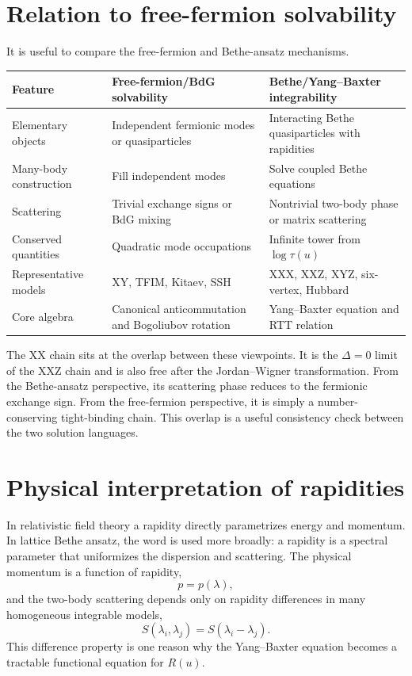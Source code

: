 \section{Relation to free-fermion solvability}
\label{sec:bethe-vs-free-fermion-preview}

It is useful to compare the free-fermion and Bethe-ansatz mechanisms.

\begin{center}
\begin{tabularx}{\textwidth}{L{0.26\textwidth}Y Y}
\toprule
Feature & Free-fermion/BdG solvability & Bethe/Yang--Baxter integrability \\
\midrule
Elementary objects & Independent fermionic modes or quasiparticles & Interacting Bethe quasiparticles with rapidities \\
Many-body construction & Fill independent modes & Solve coupled Bethe equations \\
Scattering & Trivial exchange signs or BdG mixing & Nontrivial two-body phase or matrix scattering \\
Conserved quantities & Quadratic mode occupations & Infinite tower from $\log\tau(u)$ \\
Representative models & XY, TFIM, Kitaev, SSH & XXX, XXZ, XYZ, six-vertex, Hubbard \\
Core algebra & Canonical anticommutation and Bogoliubov rotation & Yang--Baxter equation and RTT relation \\
\bottomrule
\end{tabularx}
\end{center}

The XX chain sits at the overlap between these viewpoints.  It is the
$\Delta=0$ limit of the XXZ chain and is also free after the Jordan--Wigner
transformation.  From the Bethe-ansatz perspective, its scattering phase reduces
to the fermionic exchange sign.  From the free-fermion perspective, it is simply a
number-conserving tight-binding chain.  This overlap is a useful consistency
check between the two solution languages.

\section{Physical interpretation of rapidities}
\label{sec:rapidities-preview}

In relativistic field theory a rapidity directly parametrizes energy and momentum.
In lattice Bethe ansatz, the word is used more broadly: a rapidity is a spectral
parameter that uniformizes the dispersion and scattering.  The physical momentum
is a function of rapidity,
\begin{equation}
    p=p(\lambda),
\end{equation}
and the two-body scattering depends only on rapidity differences in many
homogeneous integrable models,
\begin{equation}
    S(\lambda_i,\lambda_j)=S(\lambda_i-\lambda_j).
\end{equation}
This difference property is one reason why the Yang--Baxter equation becomes a
tractable functional equation for $R(u)$.

